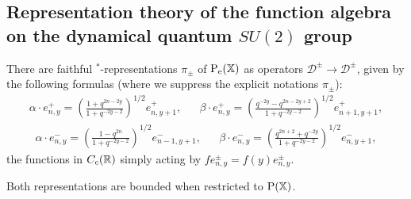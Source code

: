 

\subsection{Representation theory of the function algebra on the dynamical quantum $SU(2)$ group}



\begin{Lem} There are faithful $^*$-representations $\pi_{\pm}$ of $\operatorname{\mathrm{P}}_{\operatorname{\mathrm{e}}}(\mathbb{X})$ as operators $\mathscr{D}^{\pm}\rightarrow \mathscr{D}^{\pm}$, given by the following formulas (where we suppress the explicit notations $\pi_{\pm}$): \begin{align*} \alpha\cdot e_{n,y}^+ = \left(\frac{1+q^{2n-2y}}{1+q^{-2y-2}}\right)^{1/2}e_{n,y+1}^+,&& \beta\cdot e_{n,y}^+ = \left(\frac{q^{-2y}-q^{2n-2y+2}}{1+q^{-2y-2}}\right)^{1/2}e_{n+1,y+1}^+,\end{align*}
\begin{align*} \alpha\cdot e_{n,y}^- = \left(\frac{1-q^{2n}}{1+q^{-2y-2}}\right)^{1/2}e_{n-1,y+1}^-,&& \beta\cdot e_{n,y}^- = \left(\frac{q^{2n+2}+q^{-2y}}{1+q^{-2y-2}}\right)^{1/2}e_{n,y+1}^-,\end{align*} the functions in $C_c(\mathbb{R})$ simply acting by $fe_{n,y}^{\pm}= f(y)e_{n,y}^{\pm}$.

Both representations are bounded when restricted to $\operatorname{\mathrm{P}}(\mathbb{X})$.
\end{Lem}



